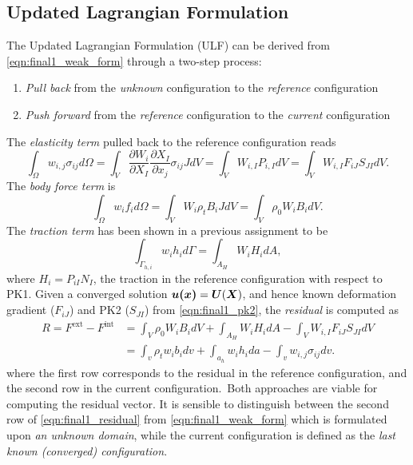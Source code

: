 \subsection{Updated Lagrangian Formulation}
The Updated Lagrangian Formulation (ULF) can be derived from \cref{eqn:final1_weak_form} through a two-step process: 
\begin{enumerate}[1.]
    \item \emph{Pull back} from the \emph{unknown} configuration to the \emph{reference} configuration 
    \item \emph{Push forward} from the \emph{reference} configuration to the \emph{current} configuration
\end{enumerate} 
The \emph{elasticity term} pulled back to the reference configuration reads
\begin{equation}\label{eqn:final1_ref_nf}
    \int_\Omega w_{i,j} \sigma_{ij} d\Omega = \int_{V} \frac{\partial W_i}{\partial X_I} \frac{\partial X_I}{\partial x_j} \sigma_{ij} J dV = \int_{V} W_{i,I} P_{i,I} dV = \int_V W_{i,I} F_{iJ} S_{JI} dV.
\end{equation}
The \emph{body force term} is 
\begin{equation}\label{eqn:final1_ref_bf}
    \int_\Omega w_i f_i d\Omega = \int_{V} W_i \rho_t B_i J dV = \int_{V} \rho_0 W_i B_i dV.
\end{equation}
The \emph{traction term} has been shown in a previous assignment to be 
\begin{equation}\label{eqn:final1_ref_tf}
    \int_{\Gamma_{h,i}} w_i h_i d\Gamma = \int_{A_H} W_i H_i dA,
\end{equation}
where $H_i = P_{iI} N_I$, the traction in the reference configuration with respect to PK1. 
Given a converged solution $\bm{u(\bm{x})} = \bm{U}(\bm{X})$, and hence known deformation gradient ($F_{iJ}$) and PK2 ($S_{JI}$) from \cref{eqn:final1_pk2}, the \emph{residual} is computed as 
\begin{equation}\label{eqn:final1_residual}
\begin{aligned}
    R = F^{\textrm{ext}} - F^{\textrm{int}} &= \int_{V} \rho_0 W_i B_i dV + \int_{A_H} W_i H_i dA - \int_{V} W_{i,I} F_{iJ} S_{JI} dV \\
    &= \int_v \rho_t w_i b_i dv + \int_{a_h} w_i h_i da - \int_v w_{i,j} \sigma_{ij} dv.
\end{aligned}
\end{equation}
where the first row corresponds to the residual in the reference configuration, and the second row in the current configuration.\
Both approaches are viable for computing the residual vector. 
It is sensible to distinguish between the second row of \cref{eqn:final1_residual} from \cref{eqn:final1_weak_form} which is formulated upon \emph{an unknown domain}, while the current configuration is defined as the \emph{last known (converged) configuration}.

